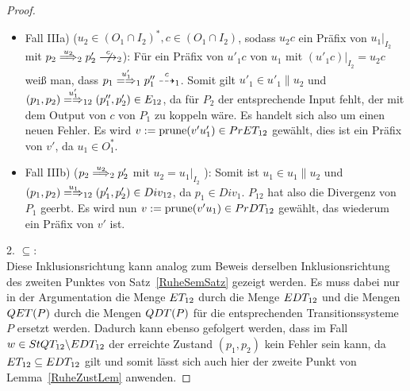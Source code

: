 \begin{proof}
\begin{itemize}
\begin{itemize}
        \item Fall IIIa) \big($u_2\in (O_1\cap I_2)^*,c\in (O_1\cap I_2)$,
          sodass $u_2c$ ein Präfix von $u_1|_{I_2}$ mit $p_2\weakmust[u_2]_2
          p'_2 \nmust[c]_2$\big): Für ein Präfix von $u'_1c$ von $u_1$ mit
          $(u'_1c)|_{I_2}=u_2c$ weiß man, dass $p_1\weakmay[u'_1]_1 p''_1
          \may[c]_1$. Somit gilt $u'_1\in u'_1\|u_2$ und $(p_1,p_2)
          \weakmay[u'_1]_{12} (p''_1,p'_2)\in E_{12}$, da für $P_2$ der
          entsprechende Input fehlt, der mit dem Output von $c$ von $P_1$ zu
          koppeln wäre. Es handelt sich also um einen neuen
          Fehler. Es wird $v:=\mathrm{prune} (v'u'_1) \in PrET _{12}$
          gewählt, dies ist ein Präfix von $v'$, da $u_1\in O^*_1$.
        \item Fall IIIb) \big($p_2\weakmust[u_2]_2 p'_2$ mit $u_2=u_1|_{I_2}$
          \big): Somit ist $u_1\in u_1\|u_2$ und $(p_1,p_2)\weakmay[u_1]_{12}
          (p'_1,p'_2)\in Div _{12}$, da $p_1\in Div _1$. $P_{12}$ hat also die
          Divergenz von $P_1$ geerbt. Es wird nun $v:=\mathrm{prune} (v'u_1)\in PrDT
          _{12}$ gewählt, das wiederum ein Präfix von $v'$ ist.
      \end{itemize}
  \end{itemize}

  2. \glqq$\subseteq$\grqq{}:\\
  Diese Inklusionsrichtung kann analog zum Beweis derselben Inklusionsrichtung
  des zweiten Punktes von Satz~\ref{RuheSemSatz} gezeigt werden. Es muss dabei
  nur in der Argumentation die Menge $ET _{12}$ durch die Menge $EDT _{12}$
  und die Mengen $QET (P)$ durch die Mengen $QDT (P)$ für die entsprechenden
  Transitionssysteme $P$ ersetzt werden. Dadurch kann ebenso gefolgert werden,
  dass im Fall $w\in StQT _{12}\backslash EDT _{12}$ der erreichte Zustand
  $(p_1,p_2)$ kein Fehler sein kann, da $ET _{12}\subseteq EDT
  _{12}$ gilt und somit lässt sich auch hier der zweite Punkt von
  Lemma~\ref{RuheZustLem} anwenden.


\end{proof}
